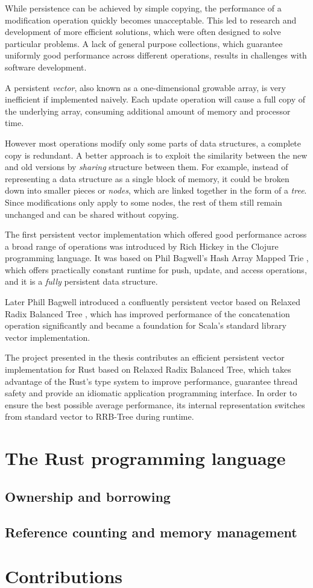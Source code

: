 While persistence can be achieved by simple copying, the performance of a modification operation quickly becomes unacceptable. This led to research and development of more efficient solutions, which were often designed to solve particular problems. A lack of general purpose collections, which guarantee uniformly good performance across different operations, results in challenges with software development. 

A persistent \emph{vector}, also known as a one-dimensional growable array, is very inefficient if implemented naively. Each update operation will cause a full copy of the underlying array, consuming additional amount of memory and processor time. 

However most operations modify only some parts of data structures, a complete copy is redundant. A better approach is to exploit the similarity between the new and old versions by \emph{sharing} structure between them. For example, instead of representing a data structure as a single block of memory, it could be broken down into smaller pieces or \emph{nodes}, which are linked together in the form of a \emph{tree}. Since modifications only apply to some nodes, the rest of them still remain unchanged and can be shared without copying. 

The first persistent vector implementation which offered good performance across a broad range of operations was introduced by Rich Hickey in the Clojure programming language. It was based on Phil Bagwell's Hash Array Mapped Trie \cite{ideal-hash-trees}, which offers practically constant runtime for push, update, and access operations, and it is a \emph{fully} persistent data structure. 

Later Phill Bagwell introduced a confluently persistent vector based on Relaxed Radix Balanced Tree \cite{efficient-immutable-vectors}, which has improved performance of the concatenation operation significantly and became a foundation for Scala's standard library vector implementation. 

The project presented in the thesis contributes an efficient persistent vector implementation for Rust based on Relaxed Radix Balanced Tree, which takes advantage of the Rust's type system to improve performance, guarantee thread safety and provide an idiomatic application programming interface. In order to ensure the best possible average performance, its internal representation switches from standard vector to RRB-Tree during runtime. 

\section{The Rust programming language}

\subsection{Ownership and borrowing}

\subsection{Reference counting and memory management}

\section{Contributions}
